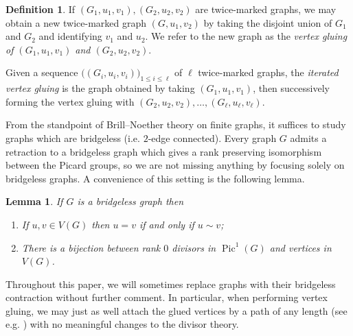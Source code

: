 \documentclass[11pt]{article}
\newtheorem{lemma}[theo]{Lemma}
\theoremstyle{definition}
\newtheorem{defi}[theo]{Definition}
\numberwithin{equation}{section}
\newcommand{\Pic}{\operatorname{Pic}}
\begin{document}
\begin{defi}
    If $(G_1,u_1,v_1),(G_2,u_2,v_2)$ are twice-marked graphs, we may obtain a new twice-marked graph $(G,u_1,v_2)$ by taking the disjoint union of $G_1$ and $G_2$ and identifying $v_1$ and $u_2$. We refer to the new graph as the \textit{vertex gluing of $(G_1,u_1,v_1)$ and $(G_2,u_2,v_2)$}.
    
    Given a sequence $\Big( (G_i, u_i, v_i) \Big)_{1 \leq i \leq \ell}$ of $\ell$ twice-marked graphs, the \emph{iterated vertex gluing} is the graph obtained by taking $(G_1,u_1,v_1)$, then successively forming the vertex gluing with $(G_2, u_2, v_2), \ldots ,(G_\ell, u_\ell, v_\ell)$.
\end{defi}

From the standpoint of Brill--Noether theory on finite graphs, it suffices to study graphs which are bridgeless (i.e. $2$-edge connected). Every graph $G$ admits a retraction to a bridgeless graph which gives a rank preserving isomorphism between the Picard groups, so we are not missing anything by focusing solely on bridgeless graphs. A convenience of this setting is the following lemma.

\begin{lemma}\label{lem-bridgelessFacts}
    If $G$ is a bridgeless graph then
    \begin{enumerate}[label = \arabic*)]
        \item If $u,v \in V(G)$ then $u = v$ if and only if $u \sim v$;
        \item There is a bijection between rank $0$ divisors in $\Pic^1(G)$ and vertices in $V(G)$.
    \end{enumerate} 
\end{lemma}

Throughout this paper, we will sometimes replace graphs with their bridgeless contraction without further comment. In particular, when performing vertex gluing, we may just as well attach the glued vertices by a path of any length (see e.g. ) with no meaningful changes to the divisor theory.
\end{document}
